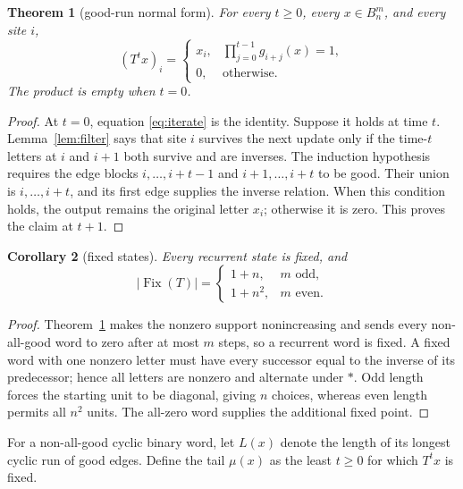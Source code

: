 \documentclass[a4paper,10pt]{amsart}
\newtheorem{theorem}{Theorem}[section]
\newtheorem{corollary}[theorem]{Corollary}
\theoremstyle{remark}
\newcommand{\Bn}{B_n}
\newcommand{\Fix}{\operatorname{Fix}}
\begin{document}
\begin{theorem}[good-run normal form]\label{thm:iterate}
For every $t\geq0$, every $x\in\Bn^m$, and every site $i$,
\begin{equation}\label{eq:iterate}
 (T^t x)_i=\begin{cases}
 x_i,&\displaystyle\prod_{j=0}^{t-1}g_{i+j}(x)=1,\\
 0,&\text{otherwise}.
 \end{cases}
\end{equation}
The product is empty when $t=0$.
\end{theorem}

\begin{proof}
At $t=0$, equation \eqref{eq:iterate} is the identity.  Suppose it holds at
time $t$.  Lemma~\ref{lem:filter} says that site $i$ survives the next update
only if the time-$t$ letters at $i$ and $i+1$ both survive and are inverses.
The induction hypothesis requires the edge blocks
$i,\ldots,i+t-1$ and $i+1,\ldots,i+t$ to be good.  Their union is
$i,\ldots,i+t$, and its first edge supplies the inverse relation.  When this
condition holds, the output remains the original letter $x_i$; otherwise it
is zero.  This proves the claim at $t+1$.
\end{proof}

\begin{corollary}[fixed states]\label{cor:fixed}
Every recurrent state is fixed, and
\begin{equation}\label{eq:fixed}
 |\Fix(T)|=\begin{cases}1+n,&m\text{ odd},\\1+n^2,&m\text{ even}.
 \end{cases}
\end{equation}
\end{corollary}

\begin{proof}
Theorem~\ref{thm:iterate} makes the nonzero support nonincreasing and sends
every non-all-good word to zero after at most $m$ steps, so a recurrent word
is fixed.  A fixed word with one nonzero letter must have every successor
equal to the inverse of its predecessor; hence all letters are nonzero and
alternate under $*$.  Odd length forces the starting unit to be diagonal,
giving $n$ choices, whereas even length permits all $n^2$ units.  The
all-zero word supplies the additional fixed point.
\end{proof}

For a non-all-good cyclic binary word, let $L(x)$ denote the length of its
longest cyclic run of good edges.  Define the tail $\mu(x)$ as the least
$t\geq0$ for which $T^t x$ is fixed.
\end{document}
